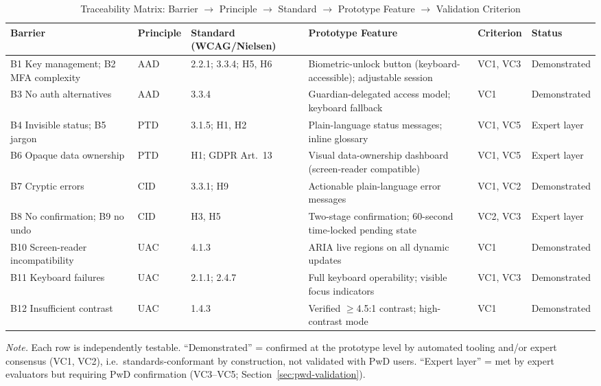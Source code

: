 \documentclass[journal,onecolumn]{IEEEtran}
\begin{document}
\begin{table}[htbp]
\centering
\small
\caption{Traceability Matrix: Barrier $\rightarrow$ Principle $\rightarrow$ Standard $\rightarrow$ Prototype Feature $\rightarrow$ Validation Criterion}
\label{tab:traceability}
\begin{adjustbox}{max width=\textwidth}
\begin{tabular}{|p{2.5cm}|p{1.0cm}|p{2.2cm}|p{3.6cm}|p{1.2cm}|p{1.6cm}|}
\hline
\textbf{Barrier} & \textbf{Principle} & \textbf{Standard (WCAG/Nielsen)} & \textbf{Prototype Feature} & \textbf{Criterion} & \textbf{Status} \\
\hline
B1 Key management; B2 MFA complexity & AAD & 2.2.1; 3.3.4; H5, H6 & Biometric-unlock button (keyboard-accessible); adjustable session & VC1, VC3 & Demonstrated \\
\hline
B3 No auth alternatives & AAD & 3.3.4 & Guardian-delegated access model; keyboard fallback & VC1 & Demonstrated \\
\hline
B4 Invisible status; B5 jargon & PTD & 3.1.5; H1, H2 & Plain-language status messages; inline glossary & VC1, VC5 & Expert layer \\
\hline
B6 Opaque data ownership & PTD & H1; GDPR Art.~13 & Visual data-ownership dashboard (screen-reader compatible) & VC1, VC5 & Expert layer \\
\hline
B7 Cryptic errors & CID & 3.3.1; H9 & Actionable plain-language error messages & VC1, VC2 & Demonstrated \\
\hline
B8 No confirmation; B9 no undo & CID & H3, H5 & Two-stage confirmation; 60-second time-locked pending state & VC2, VC3 & Expert layer \\
\hline
B10 Screen-reader incompatibility & UAC & 4.1.3 & ARIA live regions on all dynamic updates & VC1 & Demonstrated \\
\hline
B11 Keyboard failures & UAC & 2.1.1; 2.4.7 & Full keyboard operability; visible focus indicators & VC1, VC3 & Demonstrated \\
\hline
B12 Insufficient contrast & UAC & 1.4.3 & Verified $\geq$4.5:1 contrast; high-contrast mode & VC1 & Demonstrated \\
\hline
\end{tabular}
\end{adjustbox}
{\footnotesize\textit{Note.} Each row is independently testable. ``Demonstrated'' = confirmed at the prototype level by automated tooling and/or expert consensus (VC1, VC2), i.e.\ standards-conformant by construction, not validated with PwD users. ``Expert layer'' = met by expert evaluators but requiring PwD confirmation (VC3--VC5; Section~\ref{sec:pwd-validation}).}
\end{table}
\end{document}
